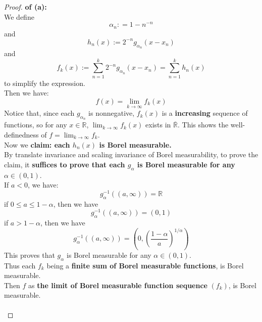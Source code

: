 \documentclass[lang=cn,11pt]{elegantbook}
\begin{document}
\begin{proof}
    \textbf{ of (a):}\\
  We define \[ \alpha_n : = 1 - n^{-n}
  \] and \[
    h_n(x) :=  2^{-n}g_{\alpha_n}(x - x_n)
    \] and \[
    f_k(x) := \sum_{n=1}^k 2^{-n}g_{\alpha_n}(x-x_n) = \sum_{n=1}^k  h_n(x)
    \] to simplify the expression.\\
Then we have: \[
f(x) = \lim_{k \rightarrow \infty} f_k(x)
\]
 Notice that, since each $g_{\alpha_n}$ is nonnegative, $f_k(x)$ is a \textbf{increasing} sequence of functions, so for any $x \in \mathbb{R}$, $ \lim_{k\to \infty} f_k(x)$ exists in $\overline{\mathbb{R}}$. This shows the well-definedness of $f  = \lim_{k\to \infty} f_k$. \\
Now we \textbf{claim: each $h_n(x)$ is Borel measurable.}\\
By translate invariance and scaling invariance of Borel measurability, to prove the claim, it \textbf{suffices to prove that each $g_{\alpha}$ is Borel measurable for any $\alpha \in (0,1)$}.\\
If $a < 0$, we have:  \[
g_\alpha^{-1}((a,\infty)) =  \mathbb{R}
\]
if $ 0 \leq a \leq  1-\alpha$, then we have \[
g_\alpha^{-1}((a,\infty)) = (0,1)
\]
if $ a > 1-\alpha$, then we have \[
g_\alpha^{-1}((a,\infty)) = (0,(\frac{1-\alpha}{a})^{1/\alpha})
\]
This proves that $g_\alpha$ is Borel measurable for any $\alpha \in (0,1)$.\\
Thus each $f_k$ being a \textbf{finite sum of Borel measurable functions}, is Borel measurable.\\
Then $f $ as \textbf{the limit of Borel measurable function sequence} $(f_k)$, is Borel measurable.\\\\
\end{proof}
\end{document}
